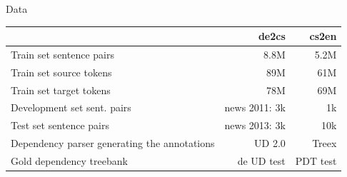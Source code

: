 \documentclass{beamer}
\begin{document}
\begin{frame}{Data}
\begin{table}[t]
\small
\begin{center}
\begin{tabular}{lrr}
	& \textbf{de2cs} & \textbf{cs2en} \\
\hline
Train set sentence pairs     		& 8.8M      	& 5.2M \\
Train set source tokens		        & 89M  		    & 61M \\
Train set target tokens		        & 78M  		    & 69M \\
Development set sent. pairs         & news 2011: 3k & 1k \\
Test set sentence pairs          	& news 2013: 3k & 10k \\
Dependency parser generating the annotations				  	& UD 2.0 & Treex \\
Gold dependency treebank     & de UD test & PDT test  \\
\end{tabular}
\end{center}
\end{table}
\end{frame}

\end{document}
